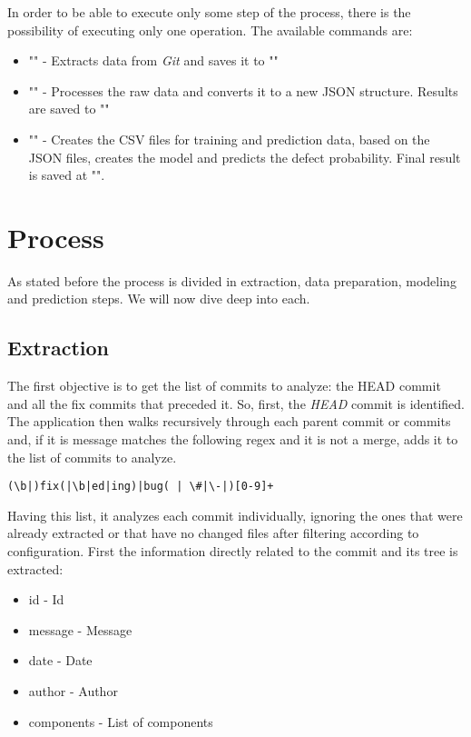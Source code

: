 In order to be able to execute only some step of the process, there is the possibility of executing only one operation. The available commands are:
%
\begin{itemize}
\item "" - Extracts data from \emph{Git} and saves it to ""
\item "" - Processes the raw data and converts it to a new JSON structure. Results are saved to ""
\item "" - Creates the CSV files for training and prediction data, based on the JSON files, creates the model and predicts the defect probability.
Final result is saved at "".
\end{itemize}

\section{Process}

As stated before the process is divided in extraction, data preparation, modeling and prediction steps. We will now dive deep into each.

\subsection{Extraction}

The first objective is to get the list of commits to analyze: the HEAD commit and all the fix commits that preceded it.
So, first, the \emph{HEAD} commit is identified. The application then walks recursively through each parent commit or commits and,
if it is message matches the following regex and it is not a merge, adds it to the list of commits to analyze.

\begin{lstlisting}
(\b|)fix(|\b|ed|ing)|bug( | \#|\-|)[0-9]+
\end{lstlisting}

Having this list, it analyzes each commit individually, ignoring the ones that were already extracted or that have no changed files after filtering according to configuration.
First the information directly related to the commit and its tree is extracted:
%
\begin{itemize}
\item id - Id
\item message - Message
\item date - Date
\item author - Author
\item components - List of components
\end{itemize}

